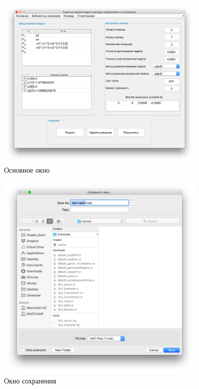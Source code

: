 \documentclass[oneside,final,12pt]{extreport}
\begin{document}
\begin{figure}[h]
	\centering
		\includegraphics[width=0.9\textwidth]{1}
		\caption{Основное окно}
		\label{gr1}
\end{figure}

\begin{figure}[h]
	\centering
	\includegraphics[width=0.9\textwidth]{2}
	\caption{Окно сохранения}
	\label{gr1}
\end{figure}
\end{document}

